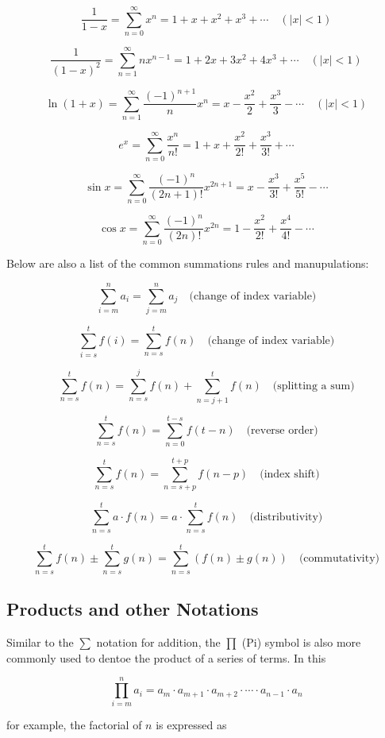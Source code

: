 \documentclass[12pt]{article}
\theoremstyle{plain}
\theoremstyle{definition}
\begin{document}
\[
\frac{1}{1 - x} = \sum_{n=0}^{\infty} x^n = 1 + x + x^2 + x^3 + \cdots \quad (\lvert x \rvert < 1)
\]

\[
\frac{1}{(1-x)^2} = \sum_{n=1}^{\infty} n x^{n-1} = 1 + 2x + 3x^2 + 4x^3 + \cdots \quad (\lvert x \rvert < 1)
\]

\[
\ln(1 + x) = \sum_{n=1}^{\infty} \frac{(-1)^{n+1}}{n} x^n = x - \frac{x^2}{2} + \frac{x^3}{3} - \cdots \quad (\lvert x \rvert < 1)
\]

\[
e^x = \sum_{n=0}^{\infty} \frac{x^n}{n!} = 1 + x + \frac{x^2}{2!} + \frac{x^3}{3!} + \cdots
\]

\[
\sin x = \sum_{n=0}^{\infty} \frac{(-1)^n}{(2n+1)!} x^{2n+1} = x - \frac{x^3}{3!} + \frac{x^5}{5!} - \cdots
\]

\[
\cos x = \sum_{n=0}^{\infty} \frac{(-1)^n}{(2n)!} x^{2n} = 1 - \frac{x^2}{2!} + \frac{x^4}{4!} - \cdots
\]

Below are also a list of the common summations rules and manupulations:

\[
\sum_{i=m}^{n} a_i = \sum_{j=m}^{n} a_j \quad \text{(change of index variable)}
\]

\[
\sum_{i=s}^{t} f(i) = \sum_{n=s}^{t} f(n) \quad \text{(change of index variable)}
\]

\[
\sum_{n=s}^{t} f(n) = \sum_{n=s}^{j} f(n) + \sum_{n=j+1}^{t} f(n) \quad \text{(splitting a sum)}
\]

\[
\sum_{n=s}^{t} f(n) = \sum_{n=0}^{t-s} f(t-n) \quad \text{(reverse order)}
\]

\[
\sum_{n=s}^{t} f(n) = \sum_{n=s+p}^{t+p} f(n-p) \quad \text{(index shift)}
\]

\[
\sum_{n=s}^{t} a \cdot f(n) = a \cdot \sum_{n=s}^{t} f(n) \quad \text{(distributivity)}
\]

\[
\sum_{n=s}^{t} f(n) \pm \sum_{n=s}^{t} g(n) = \sum_{n=s}^{t} \left(f(n) \pm g(n)\right) \quad \text{(commutativity)}
\]


\subsection{Products and other Notations}

Similar to the $\sum$ notation for addition, the $\prod$ (Pi) symbol is also more commonly used to dentoe the product of a series of terms. In this 

$$\prod_{i=m}^{n} a_i = a_m \cdot a_{m+1} \cdot a_{m+2} \cdot \cdots \cdot a_{n-1} \cdot a_n$$ 

for example, the factorial of $n$ is expressed as 
\end{document}
